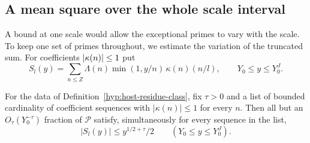 \subsection{A mean square over the whole scale interval}

A bound at one scale would allow the exceptional primes to vary with the scale. To keep one set of primes throughout, we estimate the variation of the truncated sum.
For coefficients \(\lvert\kappa(n)\rvert\le1\) put
\[
 S_l(y)=\sum_{n\le Z}\Lambda(n)\min(1,y/n)\,\kappa(n)(n/l),
 \qquad Y_0\le y\le Y_0^J .
\]
\begin{proposition}\label{prop:quadratic-host-uniform}
For the data of Definition~\ref{hyp:host-residue-class}, fix \(\tau>0\) and a
list of bounded cardinality of coefficient sequences with
\(|\kappa(n)|\le1\) for every \(n\).
Then all but an \(O_\tau(Y_0^{-\tau})\)
fraction of \(\mathcal P\) satisfy, simultaneously for every sequence in the list, 
\[
 \lvert S_l(y)\rvert\le y^{1/2+\tau}/2\qquad(Y_0\le y\le Y_0^J).
\]

\end{proposition}


